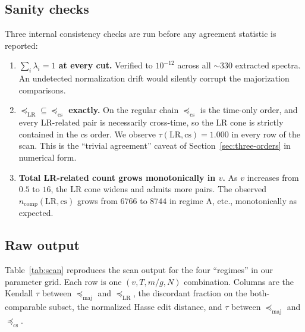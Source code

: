 \documentclass[11pt,a4paper]{article}
\theoremstyle{definition}
\theoremstyle{plain}
\theoremstyle{remark}
\newcommand{\maj}{\mathrm{maj}}
\newcommand{\LR}{\mathrm{LR}}
\newcommand{\cs}{\mathrm{cs}}
\begin{document}
\subsection{Sanity checks}

Three internal consistency checks are run before any agreement
statistic is reported:

\begin{enumerate}[label=(S\arabic*),leftmargin=*]
\item \textbf{$\sum_i \lambda_i = 1$ at every cut.}  Verified to
      $10^{-12}$ across all $\sim 330$ extracted spectra.  An
      undetected normalization drift would silently corrupt the
      majorization comparisons.
\item \textbf{$\preceq_{\LR} \subseteq \preceq_{\cs}$ exactly.}  On
      the regular chain $\preceq_{\cs}$ is the time-only order, and
      every LR-related pair is necessarily cross-time, so the LR cone
      is strictly contained in the cs order.  We observe
      $\tau(\LR, \cs) = 1.000$ in every row of the scan.  This is the
      ``trivial agreement'' caveat of
      Section~\ref{sec:three-orders} in numerical form.
\item \textbf{Total LR-related count grows monotonically in $v$.}  As
      $v$ increases from $0.5$ to $16$, the LR cone widens and admits
      more pairs.  The observed $n_{\mathrm{comp}}(\LR, \cs)$ grows
      from $6766$ to $8744$ in regime A, etc., monotonically as
      expected.
\end{enumerate}

\subsection{Raw output}

Table~\ref{tab:scan} reproduces the scan output for the four
``regimes'' in our parameter grid.  Each row is one $(v, T, m/g, N)$
combination.  Columns are the Kendall $\tau$ between
$\preceq_{\maj}$ and $\preceq_{\LR}$, the discordant fraction on the
both-comparable subset, the normalized Hasse edit distance, and
$\tau$ between $\preceq_{\maj}$ and $\preceq_{\cs}$.
\end{document}
